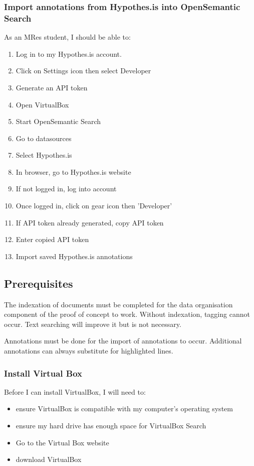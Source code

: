 \documentclass{article}
\begin{document}
\subsubsection*{Import annotations from Hypothes.is into OpenSemantic Search}

As an MRes student, I should be able to:
\begin{enumerate}
\item Log in to my Hypothes.is account.
\item Click on Settings icon then select Developer
\item Generate an API token
\item Open VirtualBox
\item Start OpenSemantic Search
\item Go to datasources
\item Select Hypothes.is
\item In browser, go to Hypothes.is website
\item If not logged in, log into account
\item Once logged in, click on gear icon then 'Developer'
\item If API token already generated, copy API token
\item Enter copied API token
\item Import saved Hypothes.is annotations
\end{enumerate}

\subsection*{Prerequisites}

The indexation of documents must be completed for the data organisation component of the proof of concept to work. Without indexation, tagging cannot occur. Text searching will improve it but is not necessary.

Annotations must be done for the import of annotations to occur. Additional annotations can always substitute for highlighted lines.

\subsubsection*{Install Virtual Box}

Before I can install VirtualBox, I will need to:
\begin{itemize}
\item ensure VirtualBox is compatible with my computer's operating system
\item ensure my hard drive has enough space for VirtualBox Search
\item Go to the Virtual Box website
\item download VirtualBox
\end{itemize} 
\end{document}
